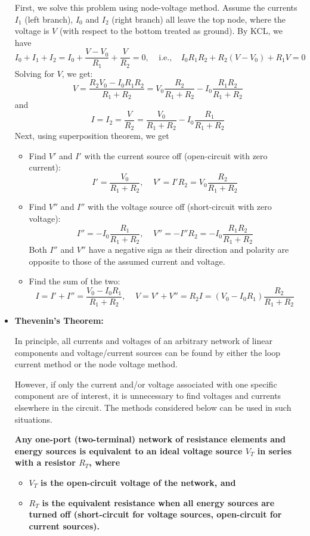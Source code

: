 \begin{itemize}
First, we solve this problem using node-voltage method. Assume the currents
$I_1$ (left branch), $I_0$ and $I_2$ (right branch) all leave the top node,
where the voltage is $V$ (with respect to the bottom treated as ground). 
By KCL, we have
\[ I_0+I_1+I_2=I_0+\frac{V-V_0}{R_1}+\frac{V}{R_2}=0,\;\;\;\;\mbox{i.e.,}\;\;\;\;
I_0R_1R_2+R_2(V-V_0)+R_1V=0 \]
Solving for $V$, we get:
\[ V=\frac{R_2V_0-I_0R_1R_2}{R_1+R_2}
  =V_0\frac{R_2}{R_1+R_2}-I_0\frac{R_1R_2}{R_1+R_2} \]
and
\[ I=I_2=\frac{V}{R_2}=\frac{V_0}{R_1+R_2}-I_0\frac{R_1}{R_1+R_2} \]
Next, using superposition theorem, we get
\begin{itemize}
\item Find $V'$ and $I'$ with the current source off (open-circuit with zero 
  current):
  \[ I'=\frac{V_0}{R_1+R_2},\;\;\;\;V'=I'R_2=V_0\frac{R_2}{R_1+R_2} \]
\item Find $V''$ and $I''$ with the voltage source off (short-circuit with 
  zero voltage):
  \[ I''=-I_0\frac{R_1}{R_1+R_2},\;\;\;\;V''=-I''R_2=-I_0\frac{R_1R_2}{R_1+R_2} \]
  Both $I''$ and $V''$ have a negative sign as their direction and polarity are
  opposite to those of the assumed current and voltage.  
\item Find the sum of the two:
  \[ I=I'+I''=\frac{V_0-I_0R_1}{R_1+R_2},\;\;\;\;
  V=V'+V''=R_2I=(V_0-I_0R_1)\frac{R_2}{R_1+R_2}	\]
\end{itemize}

\item {\bf Thevenin's Theorem:}

In principle, all currents and voltages of an arbitrary network of linear 
components and voltage/current sources can be found by either the loop 
current method or the node voltage method.

However, if only the current and/or voltage associated with one specific 
component are of interest, it is unnecessary to find voltages and currents 
elsewhere in the circuit. The methods considered below can be used in such 
situations.

{\bf Any one-port (two-terminal) network of resistance elements and energy 
sources is equivalent to an ideal voltage source $V_T$ in series with a 
resistor $R_T$, where}
\begin{itemize}
\item $V_T$ {\bf is the open-circuit voltage of the network, and}
\item $R_T$ {\bf is the equivalent resistance when all energy sources are 
turned off (short-circuit for voltage sources, open-circuit for current 
sources).}
\end{itemize}


\end{itemize}
